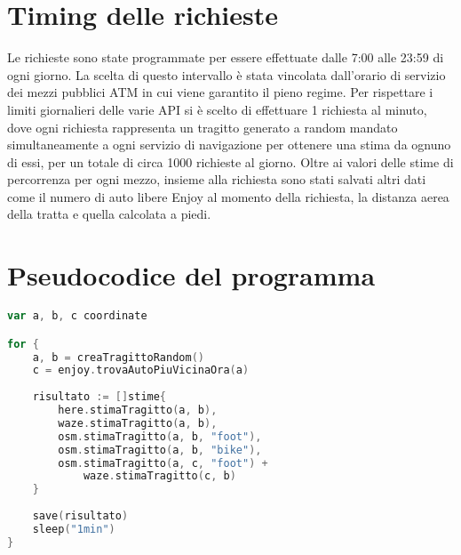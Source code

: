\section{Timing delle richieste}

Le richieste sono state programmate per essere effettuate dalle 7:00 alle 23:59 di ogni giorno. La scelta di questo intervallo è stata vincolata dall'orario di servizio dei mezzi pubblici ATM in cui viene garantito il pieno regime. Per rispettare i limiti giornalieri delle varie API si è scelto di effettuare 1 richiesta al minuto, dove ogni richiesta rappresenta un tragitto generato a random mandato simultaneamente a ogni servizio di navigazione per ottenere una stima da ognuno di essi, per un totale di circa 1000 richieste al giorno. Oltre ai valori delle stime di percorrenza per ogni mezzo, insieme alla richiesta sono stati salvati altri dati come il numero di auto libere Enjoy al momento della richiesta, la distanza aerea della tratta e quella calcolata a piedi. 

\section{Pseudocodice del programma}

\begin{lstlisting}[language=Go]
var a, b, c coordinate

for {
	a, b = creaTragittoRandom()
	c = enjoy.trovaAutoPiuVicinaOra(a)
	
	risultato := []stime{
		here.stimaTragitto(a, b),
		waze.stimaTragitto(a, b),
		osm.stimaTragitto(a, b, "foot"),
		osm.stimaTragitto(a, b, "bike"),
		osm.stimaTragitto(a, c, "foot") +
			waze.stimaTragitto(c, b)
	}
	
	save(risultato)
	sleep("1min")
}
\end{lstlisting}